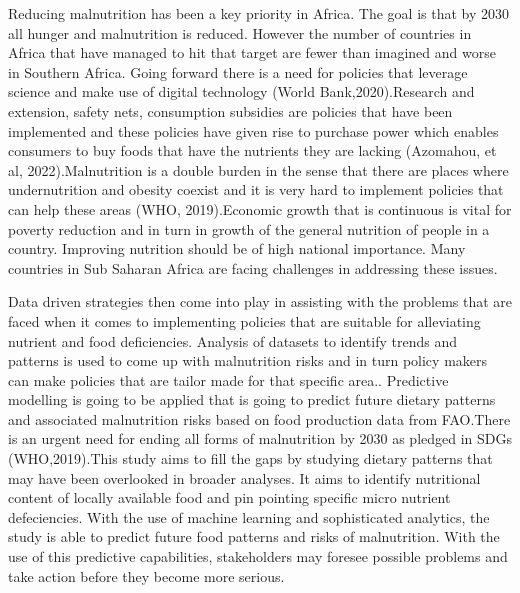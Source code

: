 \documentclass[a4paper,11pt]{report}
\begin{document}
	Reducing malnutrition has been a key priority in Africa. The goal is that by 2030 all hunger and malnutrition is reduced. However the number of countries in Africa that have managed to hit that target are fewer than imagined and worse in Southern Africa. Going forward there is a need for policies that leverage science and make use of digital technology (World Bank,2020).Research and extension, safety nets, consumption subsidies are policies that have been implemented and these policies have given rise to purchase power which enables consumers to buy foods that have the nutrients they are lacking (Azomahou, et al, 2022).Malnutrition is a double burden in the sense that there are places where undernutrition and obesity coexist and it is very hard to implement policies that can help these areas (WHO, 2019).Economic growth that is continuous is vital for poverty reduction and in turn in growth of the general nutrition of people in a country. Improving nutrition should be of high national importance. Many countries in Sub Saharan Africa are facing challenges in addressing these issues. \par
Data driven strategies then come into play in assisting with the problems that are faced when it comes to implementing policies that are suitable for alleviating nutrient and food deficiencies. Analysis of datasets to identify trends and patterns is used to come up with malnutrition risks and in turn policy makers can make policies that are tailor made for that specific area.. Predictive modelling is going to be applied that is going to predict future dietary patterns and associated malnutrition risks based on food production  data from FAO.There is an urgent need for ending all forms of malnutrition by 2030 as pledged in SDGs (WHO,2019).This study aims to fill the gaps by studying dietary patterns that may have been overlooked in broader analyses. It aims to identify nutritional content of locally available food and pin pointing specific micro nutrient defeciencies. With the use of machine learning and sophisticated analytics, the study is able to predict future food patterns and risks of malnutrition. With the use of this predictive capabilities, stakeholders may foresee possible problems and take action before they become more serious.
	
\end{document}
